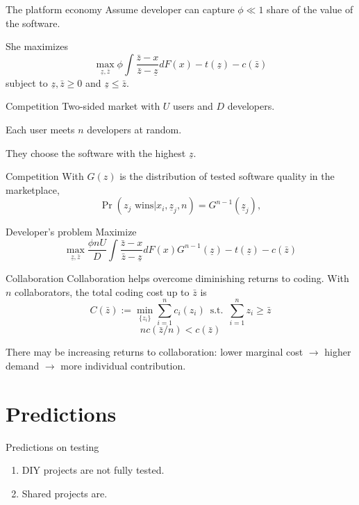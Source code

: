 \documentclass[
  ignorenonframetext,
  aspectratio=1610,
]{beamer}
\providecommand{\tightlist}{%
  \setlength{\itemsep}{0pt}\setlength{\parskip}{0pt}}
\begin{document}
\begin{frame}{The platform economy}
\label{the-platform-economy}
Assume developer can capture \(\phi \ll 1\) share of the value of the
software.

She maximizes \[
\max_{\underline z, \bar z} \phi \int \frac{\bar z- x}{\bar z - \underline z} dF(x) - t(\underline z) - c(\bar z)
\] subject to \(\underline z, \bar z \ge 0\) and
\(\underline z \le \bar z\).
\end{frame}

\begin{frame}{Competition}
\label{competition}
Two-sided market with \(U\) users and \(D\) developers.

Each user meets \(n\) developers at random.

They choose the software with the highest \(\underline z\).
\end{frame}

\begin{frame}{Competition}
\label{competition-1}
With \(G(z)\) is the distribution of tested software quality in the
marketplace, \[
\Pr(z_j \text{ wins}|x_i,\underline z_j,n) = G^{n-1}(\underline z_j),
\]
\end{frame}

\begin{frame}{Developer's problem}
\label{developers-problem}
Maximize \[
\max_{\underline z, \bar z} \frac {\phi nU}{D} \int \frac{\bar z- x}{\bar z - \underline z} dF(x) G^{n-1}(\underline z)
 - t(\underline z) - c(\bar z) 
\]
\end{frame}

\begin{frame}{Collaboration}
\label{collaboration}
Collaboration helps overcome diminishing returns to coding. With \(n\)
collaborators, the total coding cost up to \(\bar z\) is \[
C(\bar z) :=
\min_{\{z_i\}} \sum_{i=1}^n
    c_i(z_i)
    \,\text{ s.t. }\,
    \sum_{i=1}^n z_i \ge \bar z
\] \[
n c(\bar z/n) < c(\bar z)
\]

There may be increasing returns to collaboration: lower marginal cost
\(\to\) higher demand \(\to\) more individual contribution.
\end{frame}

\section{Predictions}\label{predictions}

\begin{frame}{Predictions on testing}
\label{predictions-on-testing}
\begin{enumerate}
\tightlist
\item
  DIY projects are not fully tested.
\item
  Shared projects are.
\end{enumerate}
\end{frame}
\end{document}
